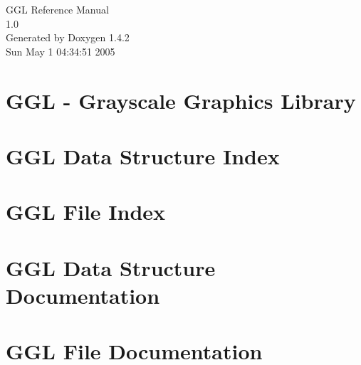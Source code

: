\documentclass[a4paper]{book}
\begin{document}
\begin{titlepage}
\vspace*{7cm}
\begin{center}
{\Large GGL Reference Manual\\[1ex]\large 1.0 }\\
\vspace*{1cm}
{\large Generated by Doxygen 1.4.2}\\
\vspace*{0.5cm}
{\small Sun May 1 04:34:51 2005}\\
\end{center}
\end{titlepage}
\clearemptydoublepage
{}
\tableofcontents
\clearemptydoublepage
{}
\chapter{GGL - Grayscale Graphics Library }
\label{index}
\chapter{GGL Data Structure Index}

\chapter{GGL File Index}

\chapter{GGL Data Structure Documentation}

\chapter{GGL File Documentation}

\printindex
\end{document}
